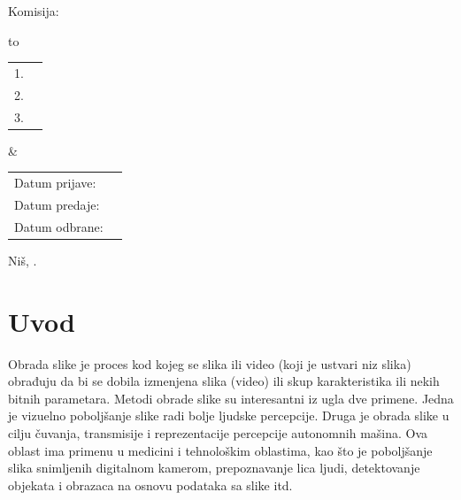 \documentclass[a4paper,12pt,titlepage]{article}
\begin{document}
\begin{titlepage}
    \vspace{1cm}
   
   \noindent
    Komisija:
    
    \vspace{0.1cm}
    
    \noindent
    \begin{tabu} to   
         \begin{tabular}{@{}ll}
            1. & \underline{\hspace{6.5cm}}\\
            2. & \underline{\hspace{6.5cm}}\\
            3. & \underline{\hspace{6.5cm}}
        \end{tabular}  
        
    &
   
        \begin{tabular}{ll@{}}
            Datum prijave: & \underline{\hspace{3cm}}\\
            Datum predaje: & \underline{\hspace{3cm}}\\
            Datum odbrane: & \underline{\hspace{3cm}}
        \end{tabular}
  
    \end{tabu}
    
    \vspace{4cm}
    
     \begin{center}
        Niš, \the\year.
    \end{center}
\end{titlepage}

\tableofcontents

\setlength{\parskip}{\baselineskip}%
\setlength{\parindent}{15pt}%

\thispagestyle{empty}
\newpage


\section{Uvod}%

Obrada slike je proces kod kojeg se slika ili video (koji je ustvari niz slika) obrađuju da bi se dobila izmenjena slika (video) ili skup karakteristika ili nekih bitnih parametara. Metodi obrade slike su interesantni iz ugla dve primene. Jedna je vizuelno poboljšanje slike radi bolje ljudske percepcije. Druga je obrada slike u cilju čuvanja, transmisije i reprezentacije percepcije autonomnih mašina. Ova oblast ima primenu u medicini i tehnološkim oblastima, kao što je poboljšanje slika snimljenih digitalnom kamerom, prepoznavanje lica ljudi, detektovanje objekata i obrazaca na osnovu podataka sa slike itd. 
\end{document}
